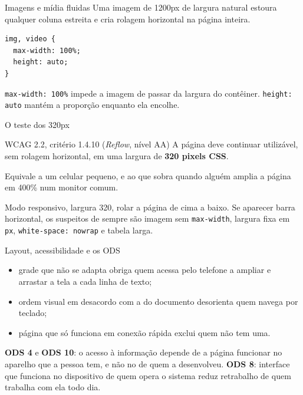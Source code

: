 \documentclass{beamer}
\begin{document}
\begin{frame}[fragile]{Imagens e mídia fluidas}
	Uma imagem de 1200px de largura natural estoura qualquer coluna estreita e
	cria rolagem horizontal na página inteira.

	\begin{verbatim}
img, video {
  max-width: 100%;
  height: auto;
}
  \end{verbatim}

	\vspace{0.2cm}
	\texttt{max-width: 100\%} impede a imagem de passar da largura do contêiner.
	\texttt{height: auto} mantém a proporção enquanto ela encolhe.
\end{frame}

\begin{frame}{O teste dos 320px}
	\begin{block}{WCAG 2.2, critério 1.4.10 (\emph{Reflow}, nível AA)}
		A página deve continuar utilizável, sem rolagem horizontal, em uma largura
		de \textbf{320 pixels CSS}.
	\end{block}

	\vspace{0.3cm}
	Equivale a um celular pequeno, e ao que sobra quando alguém amplia a página em
	400\% num monitor comum.

	\vspace{0.3cm}
	Modo responsivo, largura 320, rolar a página de cima a baixo. Se aparecer
	barra horizontal, os suspeitos de sempre são imagem sem \texttt{max-width},
	largura fixa em \texttt{px}, \texttt{white-space: nowrap} e tabela larga.
\end{frame}

\begin{frame}{Layout, acessibilidade e os ODS}
	\begin{itemize}
		\item grade que não se adapta obriga quem acessa pelo telefone a ampliar e
		      arrastar a tela a cada linha de texto;
		\item ordem visual em desacordo com a do documento desorienta quem navega
		      por teclado;
		\item página que só funciona em conexão rápida exclui quem não tem uma.
	\end{itemize}

	\vspace{0.4cm}
	\textbf{ODS 4} e \textbf{ODS 10}: o acesso à informação depende de a página
	funcionar no aparelho que a pessoa tem, e não no de quem a desenvolveu.
	\textbf{ODS 8}: interface que funciona no dispositivo de quem opera o sistema
	reduz retrabalho de quem trabalha com ela todo dia.
\end{frame}
\end{document}
